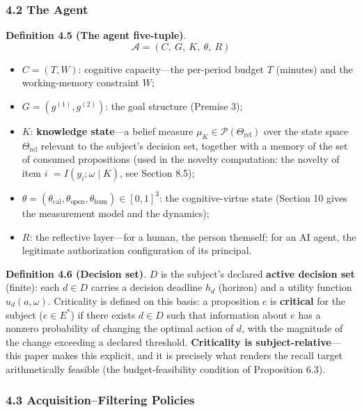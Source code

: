 \documentclass[
  11pt]{article}
\providecommand{\tightlist}{%
  \setlength{\itemsep}{0pt}\setlength{\parskip}{0pt}}
\begin{document}
\subsubsection{4.2 The Agent}\label{the-agent}

\textbf{Definition 4.5 (The agent five-tuple)}.
\[\mathcal{A} = (C,\ G,\ K,\ \theta,\ R)\]

\begin{itemize}
\tightlist
\item
  \(C = (T, W)\): cognitive capacity---the per-period budget \(T\)
  (minutes) and the working-memory constraint \(W\);
\item
  \(G = (g^{(1)}, g^{(2)})\): the goal structure (Premise 3);
\item
  \(K\): \textbf{knowledge state}---a belief measure
  \(\mu_K \in \mathcal{P}(\Theta_{\mathrm{rel}})\) over the state space
  \(\Theta_{\mathrm{rel}}\) relevant to the subject's decision set,
  together with a memory of the set of consumed propositions (used in
  the novelty computation: the novelty of item \(i\)
  \(= I(y_i; \omega \mid K)\), see Section 8.5);
\item
  \(\theta = (\theta_{\mathrm{cal}}, \theta_{\mathrm{open}}, \theta_{\mathrm{hum}}) \in [0,1]^3\):
  the cognitive-virtue state (Section 10 gives the measurement model and
  the dynamics);
\item
  \(R\): the reflective layer---for a human, the person themself; for an
  AI agent, the legitimate authorization configuration of its principal.
\end{itemize}

\textbf{Definition 4.6 (Decision set)}. \(D\) is the subject's declared
\textbf{active decision set} (finite): each \(d \in D\) carries a
decision deadline \(h_d\) (horizon) and a utility function
\(u_d(a, \omega)\). Criticality is defined on this basis: a proposition
\(e\) is \textbf{critical} for the subject (\(e \in E^*\)) if there
exists \(d \in D\) such that information about \(e\) has a nonzero
probability of changing the optimal action of \(d\), with the magnitude
of the change exceeding a declared threshold. \textbf{Criticality is
subject-relative}---this paper makes this explicit, and it is precisely
what renders the recall target arithmetically feasible (the
budget-feasibility condition of Proposition 6.3).

\subsubsection{4.3 Acquisition--Filtering
Policies}\label{acquisitionfiltering-policies}
\end{document}
